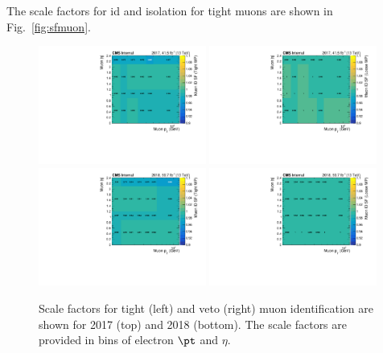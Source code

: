 The scale factors for id and isolation for tight muons are shown in Fig.~\ref{fig:sfmuon}.

\begin{figure}[ht!]
  \begin{center}
    \includegraphics[width=0.49\textwidth]{fig/efficiency/lepton/muon_eff_tight_id_2017.pdf}
    \includegraphics[width=0.49\textwidth]{fig/efficiency/lepton/muon_eff_loose_id_2017.pdf}\\
    \includegraphics[width=0.49\textwidth]{fig/efficiency/lepton/muon_eff_tight_id_2018.pdf}
    \includegraphics[width=0.49\textwidth]{fig/efficiency/lepton/muon_eff_loose_id_2018.pdf}
    \caption{
      Scale factors for tight (left) and veto (right) muon identification are shown for 2017 (top) and
      2018 (bottom). The scale factors are provided in bins of electron $\pt$ and $\eta$.
    }
    \label{fig:sf_muon_id}
  \end{center}
\end{figure}


